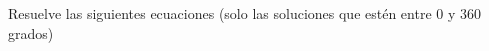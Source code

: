 \documentclass[addpoints,spanish, 12pt,a4paper]{exam}
\begin{document}
\begin{questions}

\question Resuelve las siguientes ecuaciones (solo las soluciones que estén entre 0 y 360 grados) 


\addpoints

\end{questions}
\end{document}
